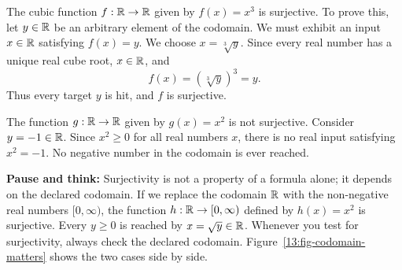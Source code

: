 \begin{example}
The cubic function $f: \mathbb{R} \to \mathbb{R}$ given by $f(x) = x^3$ is surjective.
To prove this, let $y \in \mathbb{R}$ be an arbitrary element of the codomain. We must exhibit an input $x \in \mathbb{R}$ satisfying $f(x) = y$.
We choose $x = \sqrt[3]{y}$. Since every real number has a unique real cube root, $x \in \mathbb{R}$, and
\[
f(x) = (\sqrt[3]{y})^3 = y.
\]
Thus every target $y$ is hit, and $f$ is surjective.
\end{example}

\begin{example}
The function $g: \mathbb{R} \to \mathbb{R}$ given by $g(x) = x^2$ is not surjective. Consider $y = -1 \in \mathbb{R}$. Since $x^2 \ge 0$ for all real numbers $x$, there is no real input satisfying $x^2 = -1$. No negative number in the codomain is ever reached.
\end{example}

\begin{recoverybox}
\textbf{Pause and think:} Surjectivity is not a property of a formula alone; it depends on the declared codomain. If we replace the codomain $\mathbb{R}$ with the non-negative real numbers $[0, \infty)$, the function $h: \mathbb{R} \to [0, \infty)$ defined by $h(x) = x^2$ is surjective. Every $y \ge 0$ is reached by $x = \sqrt{y} \in \mathbb{R}$. Whenever you test for surjectivity, always check the declared codomain. Figure~\ref{13:fig-codomain-matters} shows the two cases side by side.
\end{recoverybox}

